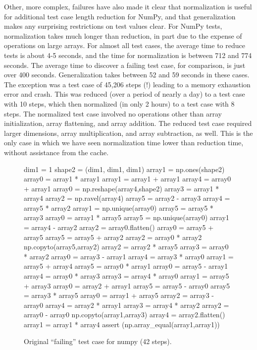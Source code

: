 Other, more complex, failures have also made it clear that
normalization is useful for additional test case length reduction for
NumPy, and that generalization makes any surprising restrictions on
test values clear.  For NumPy tests, normalization takes much longer
than reduction, in part due to the expense of operations on large
arrays.  For almost all test cases, the average time to reduce tests
is about 4-5 seconds, and the time for normalization is between 712
and 774 seconds.  The average time to discover a failing test case,
for comparison, is just over 400 seconds.  Generalization takes
between 52 and 59 seconds in these cases.  The exception was a test
case of 45,206 steps (!)  leading to a memory exhaustion error and
crash.  This was reduced (over a period of nearly a day) to a test
case with 10 steps, which then normalized (in only 2 hours) to a test
case with 8 steps.  The normalized test case involved no operations other than array
initialization, array flattening, and array
addition.  The reduced test case required larger dimensions, array
multiplication, and array subtraction, as well.  This is the only case in
which we have seen normalization time lower than reduction time,
without assistance from the cache.

\begin{figure}
{\scriptsize
\begin{code}
 dim1 = 1 
 shape2 = (dim1, dim1, dim1) 
 array1 = np.ones(shape2) 
 array0 = array1 * array1 
 array1 = array1 + array1 
 array4 = array0 + array1 
 array0 = np.reshape(array4,shape2) 
 array3 = array1 * array4 
 array2 = np.ravel(array4) 
 array5 = array2 - array3 
 array4 = array5 * array2 
 array1 = np.unique(array0) 
 array5 = array5 * array3 
 array0 = array1 * array5 
 array5 = np.unique(array0) 
 array1 = array4 - array2 
 array2 = array0.flatten() 
 array0 = array5 + array5 
 array5 = array5 + array2 
 array2 = array0 * array2 
 np.copyto(array5,array2) 
 array2 = array2 * array5 
 array3 = array0 * array2 
 array0 = array3 - array1 
 array4 = array3 * array0 
 array1 = array5 + array4 
 array5 = array0 * array1 
 array0 = array5 - array1 
 array4 = array0 * array3 
 array3 = array4 * array0 
 array1 = array5 + array3 
 array0 = array2 + array1 
 array5 = array5 - array0 
 array5 = array3 * array5 
 array0 = array1 + array5 
 array2 = array3 - array0 
 array4 = array2 * array1 
 array3 = array4 * array2 
 array2 = array0 - array0 
 np.copyto(array1,array3) 
 array4 = array2.flatten() 
 array1 = array1 * array4
 assert (np.array\_equal(array1,array1))
\end{code}
}
\caption{Original ``failing'' test case for numpy (42 steps).}
\label{numpyorig}
\end{figure}

